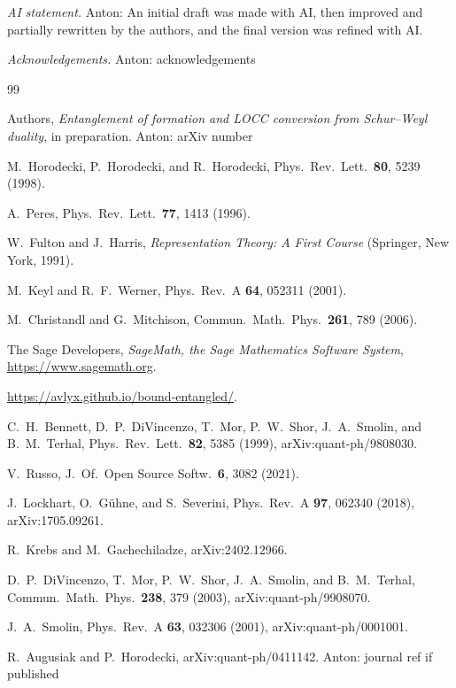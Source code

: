 \documentclass[aps,pra,twocolumn,superscriptaddress,groupedaddress]{revtex4-2}
\newcommand{\anton}[1]{{\color{antongreen} Anton: #1}}
\begin{document}
{\em AI statement.} \anton{}
An initial draft was made with AI, then improved and partially  rewritten by the authors, and the final version was refined with AI.

{\em Acknowledgements.} \anton{acknowledgements}

\begin{thebibliography}{99}

 Authors, \emph{Entanglement of formation and LOCC
conversion from Schur--Weyl duality}, in preparation. \anton{arXiv number}

 M.~Horodecki, P.~Horodecki, and R.~Horodecki,
Phys.\ Rev.\ Lett.\ \textbf{80}, 5239 (1998).

 A.~Peres, Phys.\ Rev.\ Lett.\ \textbf{77}, 1413 (1996).

 W.~Fulton and J.~Harris, \emph{Representation Theory: A
First Course} (Springer, New York, 1991).

 M.~Keyl and R.~F.~Werner, Phys.\ Rev.\ A \textbf{64},
052311 (2001).

 M.~Christandl and G.~Mitchison, Commun.\ Math.\
Phys.\ \textbf{261}, 789 (2006).

 The Sage Developers, \emph{SageMath, the Sage Mathematics
Software System}, \url{https://www.sagemath.org}.

 \url{https://avlyx.github.io/bound-entangled/}.

 C.~H.~Bennett, D.~P.~DiVincenzo, T.~Mor, P.~W.~Shor,
J.~A.~Smolin, and B.~M.~Terhal, Phys.\ Rev.\ Lett.\ \textbf{82}, 5385 (1999),
arXiv:quant-ph/9808030.

 V.~Russo, J.~Of.~Open Source Softw.\ \textbf{6}, 3082 (2021).

 J.~Lockhart, O.~G\"{u}hne, and S.~Severini,
Phys.\ Rev.\ A \textbf{97}, 062340 (2018), arXiv:1705.09261.

 R.~Krebs and M.~Gachechiladze, arXiv:2402.12966.

 D.~P.~DiVincenzo, T.~Mor, P.~W.~Shor, J.~A.~Smolin,
and B.~M.~Terhal, Commun.\ Math.\ Phys.\ \textbf{238}, 379 (2003),
arXiv:quant-ph/9908070.

 J.~A.~Smolin, Phys.\ Rev.\ A \textbf{63}, 032306 (2001),
arXiv:quant-ph/0001001.

 R.~Augusiak and P.~Horodecki, arXiv:quant-ph/0411142.
\anton{journal ref if published}


\end{thebibliography}
\end{document}
